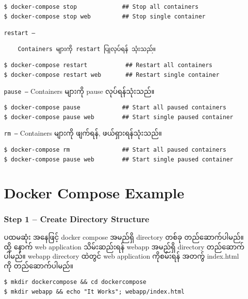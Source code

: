 \begin{verbatim}
$ docker-compose stop             ## Stop all containers
$ docker-compose stop web         ## Stop single container
\end{verbatim}

\texttt{restart\ –}

\begin{verbatim}
    Containers များကို restart ပြုလုပ်ရန် သုံးသည်။
\end{verbatim}

\begin{verbatim}
$ docker-compose restart           ## Restart all containers
$ docker-compose restart web       ## Restart single container
\end{verbatim}

\texttt{pause\ –} Containers များကို pause လုပ်ရန်သုံးသည်။

\begin{verbatim}
$ docker-compose pause            ## Start all paused containers
$ docker-compose pause web        ## Start single paused container
\end{verbatim}

\texttt{rm\ –} Containers များကို ဖျက်ရန်, ဖယ်ရှားရန်သုံးသည်။

\begin{verbatim}
$ docker-compose rm               ## Start all paused containers
$ docker-compose pause web        ## Start single paused container
\end{verbatim}

\pagebreak

\hypertarget{docker-compose-example-1}{%
\section{Docker Compose Example}\label{docker-compose-example-1}}

\hypertarget{step-1-create-directory-structure-1}{%
\subsubsection{Step 1 -- Create Directory
Structure}\label{step-1-create-directory-structure-1}}

ပထမဆုံး အနေဖြင့် docker compose အမည်ရှိ directory တစ်ခု တည်ဆောက်ပါမည်။
ထို့ နောက် web application သိမ်းဆည်းရန် webapp အမည်ရှိ directory
တည်ဆောက်ပါမည်။ webapp directory ထဲတွင် web application ကိုစမ်းရန် အတက်ွ
index.html ကို တည်ဆောက်ပါမည်။

\begin{verbatim}
$ mkdir dockercompose && cd dockercompose
$ mkdir webapp && echo "It Works"; webapp/index.html
\end{verbatim}


